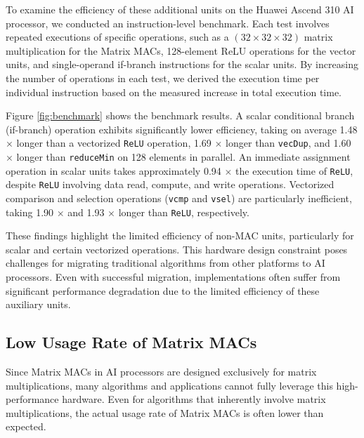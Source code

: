To examine the efficiency of these additional units on the Huawei Ascend 310 AI processor, we conducted an instruction-level benchmark. Each test involves repeated executions of specific operations, such as a $(32 \times 32 \times 32)$ matrix multiplication for the Matrix MACs, 128-element ReLU operations for the vector units, and single-operand if-branch instructions for the scalar units. By increasing the number of operations in each test, we derived the execution time per individual instruction based on the measured increase in total execution time.

Figure \ref{fig:benchmark} shows the benchmark results. A scalar conditional branch (if-branch) operation exhibits significantly lower efficiency, taking on average 1.48 $\times$ longer than a vectorized \verb|ReLU| operation, 1.69 $\times$ longer than \verb|vecDup|, and 1.60 $\times$ longer than \verb|reduceMin| on 128 elements in parallel. An immediate assignment operation in scalar units takes approximately 0.94 $\times$ the execution time of \verb|ReLU|, despite \verb|ReLU| involving data read, compute, and write operations. Vectorized comparison and selection operations (\verb|vcmp| and \verb|vsel|) are particularly inefficient, taking 1.90 $\times$ and 1.93 $\times$ longer than \verb|ReLU|, respectively.

These findings highlight the limited efficiency of non-MAC units, particularly for scalar and certain vectorized operations. This hardware design constraint poses challenges for migrating traditional algorithms from other platforms to AI processors. Even with successful migration, implementations often suffer from significant performance degradation due to the limited efficiency of these auxiliary units.

\subsection{Low Usage Rate of Matrix MACs}

Since Matrix MACs in AI processors are designed exclusively for matrix multiplications, many algorithms and applications cannot fully leverage this high-performance hardware. Even for algorithms that inherently involve matrix multiplications, the actual usage rate of Matrix MACs is often lower than expected.

